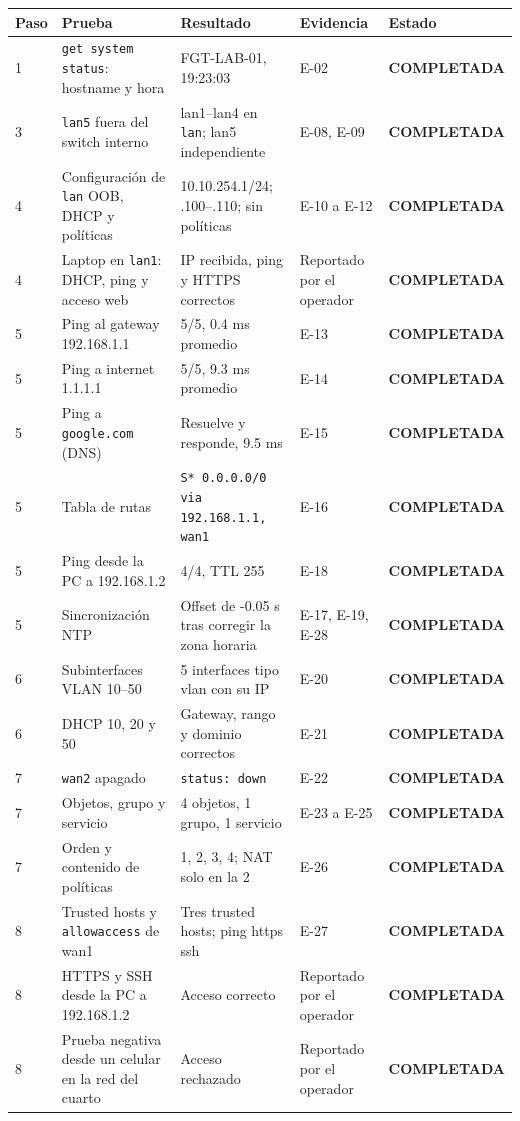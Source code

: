 \documentclass[11pt,a4paper]{article}
\newcommand{\estado}[1]{%
  \ifstrequal{#1}{COMPLETADA}{\textcolor{accent}{\textbf{#1}}}{%
  \ifstrequal{#1}{PENDIENTE}{\textcolor{warning}{\textbf{#1}}}{%
  \textcolor{navy}{\textbf{#1}}}}}
\begin{document}
{\footnotesize\noindent
\begin{tabularx}{\linewidth}{@{}P{1cm}YP{3.2cm}P{1.8cm}P{2.9cm}@{}}
\toprule
{}\textbf{Paso} & \textbf{Prueba} & \textbf{Resultado} & \textbf{Evidencia} & \textbf{Estado}\\ & \texttt{get system status}: hostname y hora & FGT-LAB-01, 19:23:03 & E-02 & \estado{COMPLETADA} \\
3 & \texttt{lan5} fuera del switch interno & lan1--lan4 en \texttt{lan}; lan5 independiente & E-08, E-09 & \estado{COMPLETADA} \\
4 & Configuración de \texttt{lan} OOB, DHCP y políticas & 10.10.254.1/24; .100--.110; sin políticas & E-10 a E-12 & \estado{COMPLETADA} \\
4 & Laptop en \texttt{lan1}: DHCP, ping y acceso web & IP recibida, ping y HTTPS correctos & Reportado por el operador & \estado{COMPLETADA} \\
5 & Ping al gateway 192.168.1.1 & 5/5, 0.4 ms promedio & E-13 & \estado{COMPLETADA} \\
5 & Ping a internet 1.1.1.1 & 5/5, 9.3 ms promedio & E-14 & \estado{COMPLETADA} \\
5 & Ping a \texttt{google.com} (DNS) & Resuelve y responde, 9.5 ms & E-15 & \estado{COMPLETADA} \\
5 & Tabla de rutas & \texttt{S* 0.0.0.0/0 via 192.168.1.1, wan1} & E-16 & \estado{COMPLETADA} \\
5 & Ping desde la PC a 192.168.1.2 & 4/4, TTL 255 & E-18 & \estado{COMPLETADA} \\
5 & Sincronización NTP & Offset de -0.05 s tras corregir la zona horaria & E-17, E-19, E-28 & \estado{COMPLETADA} \\
6 & Subinterfaces VLAN 10--50 & 5 interfaces tipo vlan con su IP & E-20 & \estado{COMPLETADA} \\
6 & DHCP 10, 20 y 50 & Gateway, rango y dominio correctos & E-21 & \estado{COMPLETADA} \\
7 & \texttt{wan2} apagado & \texttt{status: down} & E-22 & \estado{COMPLETADA} \\
7 & Objetos, grupo y servicio & 4 objetos, 1 grupo, 1 servicio & E-23 a E-25 & \estado{COMPLETADA} \\
7 & Orden y contenido de políticas & 1, 2, 3, 4; NAT solo en la 2 & E-26 & \estado{COMPLETADA} \\
8 & Trusted hosts y \texttt{allowaccess} de wan1 & Tres trusted hosts; ping https ssh & E-27 & \estado{COMPLETADA} \\
8 & HTTPS y SSH desde la PC a 192.168.1.2 & Acceso correcto & Reportado por el operador & \estado{COMPLETADA} \\
8 & Prueba negativa desde un celular en la red del cuarto & Acceso rechazado & Reportado por el operador & \estado{COMPLETADA} \\
\bottomrule
\end{tabularx}\par}
\end{document}
